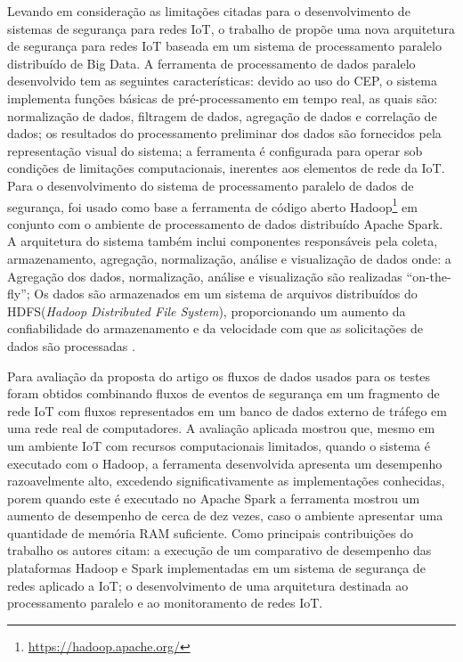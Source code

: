 \documentclass[ti,table]{texufpel} %
\begin{document}
     

    Levando em consideração as limitações citadas para o desenvolvimento de sistemas de segurança para redes IoT, o trabalho de \cite{art8kotenko2017parallel} propõe uma nova arquitetura de segurança para redes IoT baseada em um sistema de processamento paralelo distribuído de Big Data. A ferramenta de processamento de dados paralelo desenvolvido tem as seguintes características: devido ao uso do CEP, o sistema implementa funções básicas de pré-processamento em tempo real, as quais são: normalização de dados, filtragem de dados, agregação de dados e correlação de dados; os resultados do processamento preliminar dos dados são fornecidos pela representação visual do sistema; a ferramenta é configurada para operar sob condições de limitações computacionais, inerentes aos elementos de rede da IoT. Para o desenvolvimento do sistema de processamento paralelo de dados de segurança, foi usado como base a ferramenta de código aberto Hadoop\footnote{\url{https://hadoop.apache.org/}} em conjunto com o ambiente de processamento de dados distribuído Apache Spark. A arquitetura do sistema também inclui componentes responsáveis pela coleta, armazenamento, agregação, normalização, análise e visualização de dados onde: a Agregação dos dados, normalização, análise e visualização são realizadas ``on-the-fly''; Os dados são armazenados em um sistema de arquivos distribuídos do HDFS(\textit{Hadoop Distributed File System}), proporcionando um aumento da confiabilidade do armazenamento e da velocidade com que as solicitações de dados são processadas \cite{art8kotenko2017parallel}. 

     

  

    Para avaliação da proposta do artigo os fluxos de dados usados para os testes foram obtidos combinando fluxos de eventos de segurança em um fragmento de rede IoT com fluxos representados em um banco de dados externo de tráfego em uma rede real de computadores. A avaliação aplicada mostrou que, mesmo em um ambiente IoT com recursos computacionais limitados, quando o sistema é executado com o Hadoop, a ferramenta desenvolvida apresenta um desempenho razoavelmente alto, excedendo significativamente as implementações conhecidas, porem quando este é executado no Apache Spark a ferramenta mostrou um aumento de desempenho de cerca de dez vezes, caso o ambiente apresentar uma quantidade de memória RAM suficiente. Como principais contribuições do trabalho os autores citam: a execução de um comparativo de desempenho das plataformas Hadoop e Spark implementadas em um sistema de segurança de redes aplicado a IoT; o desenvolvimento de uma arquitetura destinada ao processamento paralelo e ao monitoramento de redes IoT.  
\end{document}

